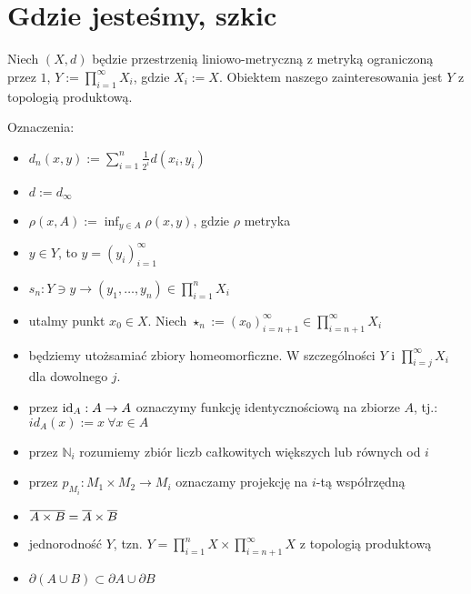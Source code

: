 \section{Gdzie jesteśmy, szkic}
Niech $(X, d)$ będzie przestrzenią liniowo-metryczną z metryką ograniczoną przez $1$, $Y := \prod_{i=1}^{\infty} X_i$, gdzie $X_i := X$. Obiektem naszego zainteresowania jest $Y$ z topologią produktową.

Oznaczenia:
\begin{itemize}
  \item $d_n(x, y) := \sum_{i=1}^n \frac{1}{2^i} d(x_i, y_i)$
  \item $d := d_\infty$
  \item $\rho(x, A) := \inf_{y \in A} \rho(x, y)$, gdzie $\rho$ metryka
  \item $y \in Y$, to $y = (y_i)_{i=1}^\infty$
  \item $s_n: Y \ni y \rightarrow (y_1, \ldots, y_n) \in \prod_{i=1}^{n} X_i$
  \item utalmy punkt $x_0 \in X$. Niech $\star_n := (x_0)_{i=n+1}^\infty \in \prod_{i=n+1}^\infty X_i$
  \item będziemy utożsamiać zbiory homeomorficzne. W szczególności $Y$ i $\prod_{i=j}^\infty X_i$ dla dowolnego $j$.
  \item przez $\mbox{id}_A: A \rightarrow A$ oznaczymy funkcję identycznościową na zbiorze $A$, tj.: $id_A(x) := x\ \forall x \in A$
  \item przez $\mathbb{N}_i$  rozumiemy zbiór liczb całkowitych większych lub równych od $i$
  \item przez $p_{M_i}: M_1 \times M_2 \rightarrow M_i$ oznaczamy projekcję na $i$-tą współrzędną
\end{itemize}

\begin{note} \mbox{} %
\begin{itemize}
  \item $\overline{A \times B} = \overline{A} \times \overline{B}$
  \item jednorodność $Y$, tzn. $Y = \prod_{i=1}^n X \times \prod_{i=n+1}^\infty X$ z topologią produktową
  \item $\partial(A \cup B) \subset \partial A \cup \partial B$
\end{itemize}
\end{note}